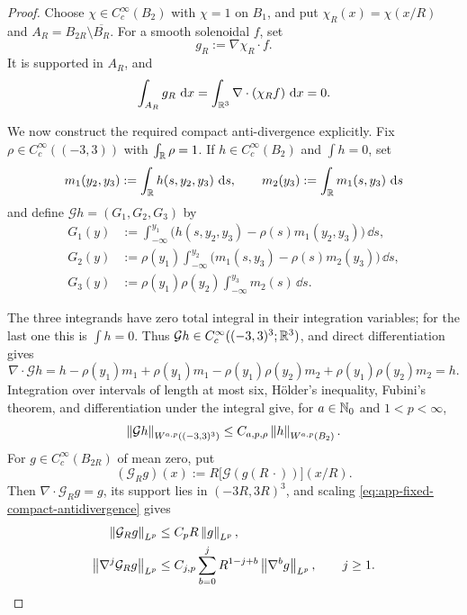 \begin{proof}
Choose \(\chi\in C_c^\infty(B_2)\) with
\(\chi=1\) on \(B_1\), and put
\(\chi_R(x)=\chi(x/R)\) and
\(A_R=B_{2R}\setminus\overline{B_R}\).  For a smooth solenoidal \(f\), set
\[
 g_R:=\nabla\chi_R\cdot f.
\]
It is supported in \(A_R\), and
\[
 \int_{A_R}g_R\,\,\mathrm d x
 =\int_{\mathbb R^3}\nabla\cdot(\chi_Rf)\,\,\mathrm d x=0.
\]
\begin{samepage}
We now construct the required compact anti-divergence explicitly.  Fix
\(\rho\in C_c^\infty((-3,3))\) with \(\int_{\mathbb R}\rho=1\).  If
\(h\in C_c^\infty(B_2)\) and \(\int h=0\), set
\[
 m_1(y_2,y_3):=\int_{\mathbb R} h(s,y_2,y_3)\,\,\mathrm d s,
 \qquad
 m_2(y_3):=\int_{\mathbb R} m_1(s,y_3)\,\,\mathrm d s
\]
and define \(\mathcal Gh=(G_1,G_2,G_3)\) by
\begin{align*}
 G_1(y)
 &:=\int_{-\infty}^{y_1}
 \bigl(h(s,y_2,y_3)-\rho(s)m_1(y_2,y_3)\bigr)\,\dd s,\\
 G_2(y)
 &:=\rho(y_1)\int_{-\infty}^{y_2}
 \bigl(m_1(s,y_3)-\rho(s)m_2(y_3)\bigr)\,\dd s,\\
 G_3(y)
 &:=\rho(y_1)\rho(y_2)
 \int_{-\infty}^{y_3}m_2(s)\,\dd s.
\end{align*}
\par
\end{samepage}
The three integrands have zero total integral in their integration
variables; for the last one this is \(\int h=0\).  Thus
\(\mathcal Gh\in C_c^\infty((-3,3)^3;\mathbb R^3)\), and direct differentiation
gives
\[
 \nabla\cdot\mathcal Gh
 =h-\rho(y_1)m_1
  +\rho(y_1)m_1-\rho(y_1)\rho(y_2)m_2
  +\rho(y_1)\rho(y_2)m_2
 =h.
\]
Integration over intervals of length at most six, H\"older's inequality,
Fubini's theorem, and differentiation under the integral give, for
\(a\in\mathbb N_0\) and \(1<p<\infty\),
\begin{equation}
 \left\lVert \mathcal Gh\right\rVert_{W^{a,p}((-3,3)^3)}
 \le C_{a,p,\rho}\left\lVert h\right\rVert_{W^{a,p}(B_2)}.
 \label{eq:app-fixed-compact-antidivergence}
\end{equation}
For \(g\in C_c^\infty(B_{2R})\) of mean zero, put
\[
 (\mathcal G_Rg)(x)
 :=R\bigl[\mathcal G(g(R\,\cdot))\bigr](x/R).
\]
Then \(\nabla\cdot\mathcal G_Rg=g\), its support lies in
\((-3R,3R)^3\), and scaling \eqref{eq:app-fixed-compact-antidivergence}
gives
\begin{align}
 \left\lVert \mathcal G_Rg\right\rVert_{L^p}
 &\le C_pR\left\lVert g\right\rVert_{L^p},\notag\\
 \left\lVert \nabla^j\mathcal G_Rg\right\rVert_{L^p}
 &\le C_{j,p}\sum_{b=0}^{j}
 R^{1-j+b}\left\lVert \nabla^bg\right\rVert_{L^p},
 \qquad j\ge1.
 \label{eq:app-scaled-compact-antidivergence}
\end{align}

\end{proof}
